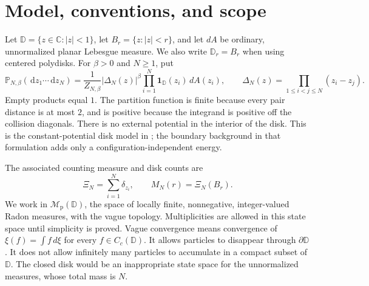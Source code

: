 \documentclass[11pt,a4paper]{article}
\numberwithin{equation}{section}
\theoremstyle{definition}
\theoremstyle{remark}
\newcommand{\D}{\mathbb D}
\newcommand{\Pbb}{\mathbb P}
\newcommand{\C}{\mathbb C}
\newcommand{\dd}{\,\mathrm d}
\newcommand{\ind}{\mathbf 1}
\newcommand{\Mp}{\mathcal M_{\mathrm p}}
\begin{document}
\begin{abstract}
screening identity. For bounded square-integrable one-body tilts of the
Bergman process, we prove a strict nonlinear screening sign and uniqueness
of the associated self-consistency equation; this does not identify a
general-temperature gas limit. A Blaschke interpolation argument reduces
nonemptiness above $2$ to a stated, unproved boundary moment estimate.
We construct infinitely many distinct infinite, rotationally invariant
solutions of the same canonical Green equations for every $0<\beta<4$.
For $\beta\le2$ these states are mutually singular with every actual
disk-gas limit. Canonical Gibbs uniqueness therefore fails, while
uniqueness and full hyperbolic
invariance for $0<\beta<4$, $\beta\ne2$, remain unproved here;
nonemptiness remains unresolved only for $2<\beta<4$.
\end{abstract}

\tableofcontents

\section{Model, conventions, and scope}
Let $\D=\{z\in\C:|z|<1\}$, let $B_r=\{z:|z|<r\}$, and let $dA$ be
ordinary, unnormalized planar Lebesgue measure. We also write $\D_r=B_r$
when using centered polydisks. For $\beta>0$ and $N\ge1$,
put
\begin{equation}\label{eq:model}
 \Pbb_{N,\beta}(\dd z_1\cdots\dd z_N)
 =\frac{1}{Z_{N,\beta}}|\Delta_N(z)|^\beta
   \prod_{i=1}^N\ind_{\D}(z_i)\,dA(z_i),
 \qquad \Delta_N(z)=\prod_{1\le i<j\le N}(z_i-z_j).
\end{equation}
Empty products equal $1$. The partition function is finite because every
pair distance is at most $2$, and is positive because the integrand is
positive off the collision diagonals. There is no external potential in
the interior of the disk. This is the constant-potential disk model in
\cite[Section 3]{Samaj}; the boundary background in that formulation adds
only a configuration-independent energy.

The associated counting measure and disk counts are
\[
 \Xi_N=\sum_{i=1}^N\delta_{z_i},\qquad M_N(r)=\Xi_N(B_r).
\]
We work in $\Mp(\D)$, the space of locally finite, nonnegative,
integer-valued Radon measures, with the vague topology. Multiplicities are
allowed in this state space until simplicity is proved. Vague convergence
means convergence of $\xi(f)=\int f\,d\xi$ for every $f\in C_c(\D)$.
It allows particles to disappear through $\partial\D$. It does not allow
infinitely many particles to accumulate in a compact subset of $\D$.
The closed disk would be an inappropriate state space for the unnormalized
measures, whose total mass is $N$.
\end{document}
